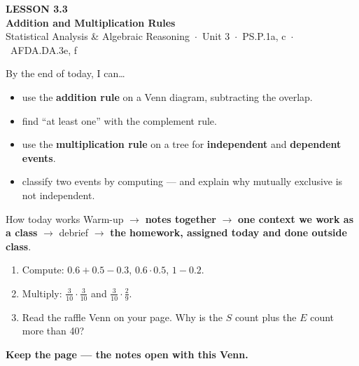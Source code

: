 \documentclass[aspectratio=169, 11pt]{beamer}
\begin{document}
{
\begin{frame}[plain]
  \vspace{2.8cm}\hspace{0.55cm}%
  \begin{minipage}{0.9\textwidth}
    {\color{goldacc}\bfseries\small LESSON 3.3}\\[0.5cm]
    {\color{white}\bfseries\LARGE Addition and Multiplication Rules}\\[1.2cm]
    {\color{frostmid}\small Statistical Analysis \& Algebraic Reasoning~$\cdot$~Unit 3~$\cdot$~PS.P.1a, c~$\cdot$~AFDA.DA.3e, f}
  \end{minipage}
\end{frame}
}

\begin{frame}[t, plain]
  By the end of today, I can\ldots
  \begin{itemize}\setlength{\itemsep}{4pt}
    \item use the \textbf{addition rule} on a Venn diagram, subtracting the overlap.
    \item find ``at least one'' with the complement rule.
    \item use the \textbf{multiplication rule} on a tree for \textbf{independent} and
          \textbf{dependent events}.
    \item classify two events by computing --- and explain why mutually exclusive is not
          independent.
  \end{itemize}
  \begin{block}{How today works}
    Warm-up $\to$ \textbf{notes together} $\to$ \textbf{one context we work as a class} $\to$
    debrief $\to$ \textbf{the homework, assigned today and done outside class}.
  \end{block}
\end{frame}

\begin{frame}[t, plain]
  \vspace{0.3cm}
  \begin{enumerate}\setlength{\itemsep}{7pt}
    \item Compute: $0.6 + 0.5 - 0.3$, \quad $0.6 \cdot 0.5$, \quad $1 - 0.2$.
    \item Multiply: $\frac{3}{10} \cdot \frac{3}{10}$ \quad and \quad
          $\frac{3}{10} \cdot \frac{2}{9}$.
    \item Read the raffle Venn on your page. Why is the $S$ count plus the $E$ count more than 40?
  \end{enumerate}
  \vspace{0.4cm}
  \begin{center}
    {\color{cerulean}\bfseries Keep the page --- the notes open with this Venn.}
  \end{center}
\end{frame}
\end{document}
